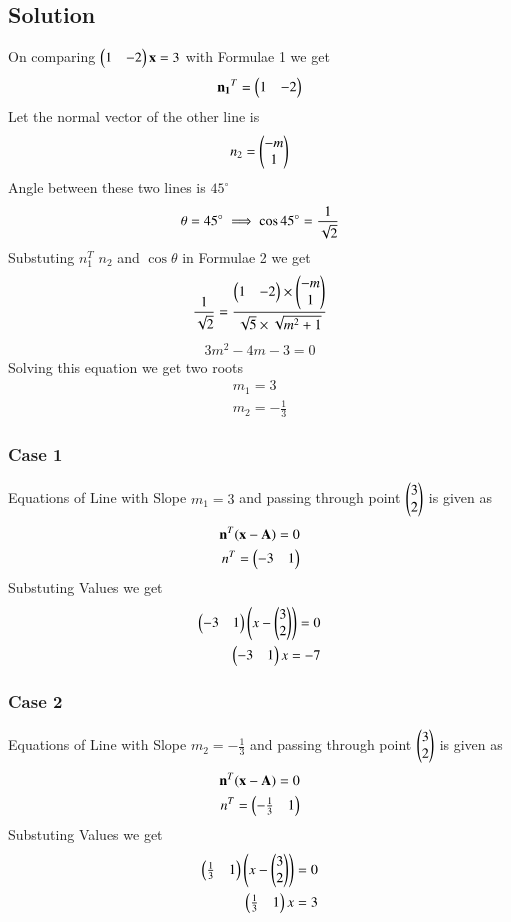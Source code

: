 \documentclass[journal,12pt,twocolumn]{IEEEtran}
\begin{document}
\subsection{Solution}
On comparing $\begin{pmatrix}1 & -2\end{pmatrix}\mathbf{x} = 3$ with Formulae 1  we get 
\begin{align}
\mathbf{n_1}^T=\begin{pmatrix}1 & -2\end{pmatrix}
\end{align}
Let the normal vector of the other line is
\begin{align}
  n_2=\begin{pmatrix}-m\\1\end{pmatrix}  
\end{align}
Angle between these two lines is $45^\circ$
\begin{align}
    \theta=45^\circ
    \implies \cos 45\degree &=\frac{1}{\sqrt{2}}\\ 
\end{align}
Substuting $n_1^T$ $n_2$ and $\cos\theta$ in Formulae 2  we get
\begin{align}
    \frac{1}{\sqrt{2}}=\frac{\begin{pmatrix}1 & -2\end{pmatrix}\times\begin{pmatrix}-m\\1\end{pmatrix}}{\sqrt{5}\times\sqrt{m^2+1}}
\end{align}
\begin{align}
    3m^2-4m-3=0
\end{align}
Solving this equation we get two roots
\begin{align}
m_1=3\\
m_2=-\frac{1}{3}
\end{align}
\subsubsection{Case 1}
Equations of Line with Slope $m_1=3$ and passing through point $\begin{pmatrix}3\\2\end{pmatrix}$ is given as
\begin{align}
   \mathbf{n}^T(\mathbf{x}-\mathbf{A})=0\\
   n^T=\begin{pmatrix}-3 & 1\end{pmatrix}
\end{align}
Substuting Values we get
\begin{align}
 \begin{pmatrix}-3 & 1\end{pmatrix}\begin{pmatrix}x-\begin{pmatrix}3\\2\end{pmatrix}\end{pmatrix}=0\\
 \begin{pmatrix}-3 & 1\end{pmatrix}x=-7
\end{align}
\subsubsection{Case 2}
Equations of Line with Slope $m_2=-\frac{1}{3}$ and passing through point $\begin{pmatrix}3\\2\end{pmatrix}$ is given as
\begin{align}
\mathbf{n}^T(\mathbf{x}-\mathbf{A})=0\\
n^T=\begin{pmatrix}-\frac{1}{3} & 1\end{pmatrix}
\end{align}
Substuting Values we get
\begin{align}
 \begin{pmatrix}\frac{1}{3} & 1\end{pmatrix}\begin{pmatrix}x-\begin{pmatrix}3\\2\end{pmatrix}\end{pmatrix}=0\\
 \begin{pmatrix}\frac{1}{3} & 1\end{pmatrix}x=3
\end{align}
\end{document}
